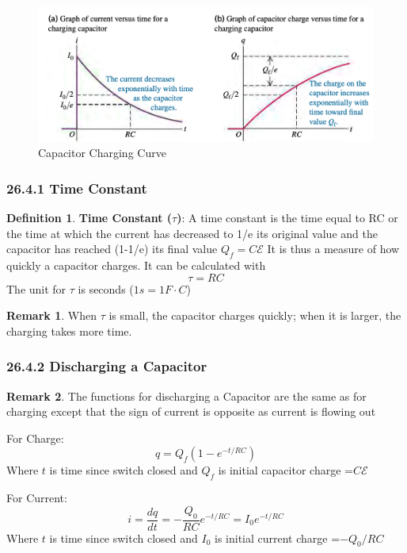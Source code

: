 \documentclass[12pt]{amsart}
\theoremstyle{definition}
\newtheorem{definition}{Definition} %
\newtheorem*{remark}{Remark}        %
\numberwithin{equation}{theorem}    %
\begin{document}
\begin{figure}[H]
    \centering
    \includegraphics[width=5in]{Media/Charging.png}
    \caption{Capacitor Charging Curve}
    \label{Capacitor Chargeing Curve}
\end{figure}

\subsubsection*{26.4.1 Time Constant}

\begin{definition}
    \textbf{Time Constant ($\tau$)}:
    A time constant is the time equal to RC or the time at which the current has decreased
    to 1/e its original value and the capacitor has reached (1-1/e) its final value $Q_f = C\mathcal{E}$
    It is thus a measure of how quickly a capacitor charges. It can be calculated with $$\tau = RC$$
    The unit for $\tau$ is seconds ($1 s = 1 F \cdot C$)
    \begin{remark}
        When $\tau$ is small, the capacitor charges quickly; 
        when it is larger, the charging takes more time.
    \end{remark}

\end{definition}

\subsubsection*{26.4.2 Discharging a Capacitor}

\begin{remark}
    The functions for discharging a Capacitor are the same as for charging except
    that the sign of current is opposite as current is flowing out
    \item For Charge: $$q = Q_f(1-e^{-t/RC})$$
        Where $t$ is time since switch closed and $Q_f$ is initial capacitor charge =$C\mathcal{E}$
        \item For Current: $$i = \frac{dq}{dt} = -\frac{{Q_0}}{RC}e^{-t/RC} = I_0e^{-t/RC}$$
        Where $t$ is time since switch closed and $I_0$ is initial current charge =$-Q_0/RC$
\end{remark}
\end{document}
